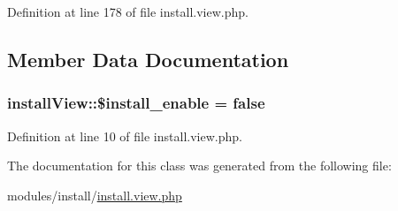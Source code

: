 Definition at line 178 of file install.\+view.\+php.



\subsection{Member Data Documentation}
\hypertarget{classinstallView_af8e64ea4a91e88a6539bef37e73d3a05}{
\subsubsection[{\$install\+\_\+enable}]{\setlength{\rightskip}{0pt plus 5cm}install\+View\+::\$install\+\_\+enable = false}}\label{classinstallView_af8e64ea4a91e88a6539bef37e73d3a05}


Definition at line 10 of file install.\+view.\+php.



The documentation for this class was generated from the following file\+:\begin{DoxyCompactItemize}
\item 
modules/install/\hyperlink{install_8view_8php}{install.\+view.\+php}\end{DoxyCompactItemize}

